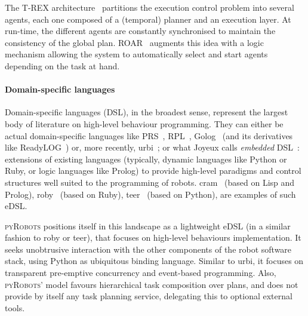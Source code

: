 \documentclass[a4paper, 10pt, conference]{ieeeconf}      %
\newcommand{\pyRobots}{\textsc{pyRobots}}
\begin{document}
The T-REX architecture~\cite{mcgann2007trex} partitions the execution control
problem into several agents, each one composed of a (temporal) planner and an
execution layer. At run-time, the different agents are constantly synchronised
to maintain the consistency of the global plan. ROAR~\cite{degroote2011roar}
augments this idea with a logic mechanism allowing the system to automatically
select and start agents depending on the task at hand.

\paragraph{Domain-specific languages}

Domain-specific languages (DSL), in the broadest sense, represent the largest
body of literature on high-level behaviour programming. They can either be
actual domain-specific languages like PRS~\cite{ingrand1996prs},
RPL~\cite{mcdermott1993reactive}, Golog~\cite{levesque1997golog} (and its
derivatives like {\sc ReadyLOG}~\cite{ferrein2007robot}) or, more recently, {\sc
urbi}~\cite{baillie2005urbi}; or what Joyeux calls \emph{embedded}
DSL~\cite{joyeux2011robot}: extensions of existing languages (typically, dynamic
languages like Python or Ruby, or logic languages like Prolog) to provide
high-level paradigms and control structures well suited to the programming of
robots. {\sc cram}~\cite{beetz2010cram} (based on Lisp and Prolog), {\sc
roby}~\cite{joyeux2009plan} (based on Ruby), {\sc teer}~\cite{magnenat2012teer}
(based on Python), are examples of such eDSL.

\pyRobots{} positions itself in this landscape as a lightweight eDSL (in a
similar fashion to {\sc roby} or {\sc teer}), that focuses on high-level
behaviours implementation. It seeks unobtrusive interaction with the other
components of the robot software stack, using Python as ubiquitous binding
language. Similar to {\sc urbi}, it focuses on transparent pre-emptive
concurrency and event-based programming.  Also, \pyRobots{}' model favours
hierarchical task composition over plans, and does not provide by itself any
task planning service, delegating this to optional external tools.
\end{document}
